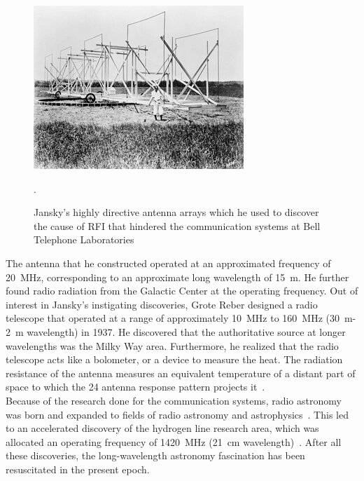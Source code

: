 \documentclass[12pt,a4paper]{report}
\begin{document}
	    \begin{figure}[htb]
	    	\begin{center}
	    		\includegraphics[width=\linewidth]{Figures/jansky1.jpg}
	    		\caption{Jansky's highly directive antenna arrays which he used to discover the cause of RFI that hindered the communication systems at Bell Telephone Laboratories~\citep{book:BasicsofRA}}.
	    		\label{Fig:Jansky}
	    	\end{center}
	    \end{figure}
	    The antenna that he constructed operated at an approximated frequency of \SI{20}{MHz}, corresponding to an approximate long wavelength of \SI{15}{m}. He further found radio radiation from the Galactic Center at the operating frequency. Out of interest in Jansky's instigating discoveries, Grote Reber designed a radio telescope that operated at a range of approximately \SI{10}{MHz} to \SI{160}{MHz} (\SI{30}{m}-\SI{2}{m} wavelength) in 1937. He discovered that the authoritative source at longer wavelengths was the Milky Way area. Furthermore, he realized that the radio telescope acts like a bolometer, or a device to measure the heat. The radiation resistance of the antenna measures an equivalent temperature of a distant part of space to which the 24 antenna response pattern projects it~\citep{1988JRASC..82...93R, CosmicStatic,2012PASP..124.1090H}.\\[0.1cm]
	    
	    Because of the research done for the communication systems, radio astronomy was born and expanded to fields of radio astronomy and astrophysics~\citep{2012PASP..124.1090H}. This led to an accelerated discovery of the hydrogen line research area, which was allocated an operating frequency of \SI{1420}{MHz} (\SI{21}{cm} wavelength)~\citep{10.2307/530765}. After all these discoveries, the long-wavelength astronomy fascination has been resuscitated in the present epoch.
	    
\end{document}
